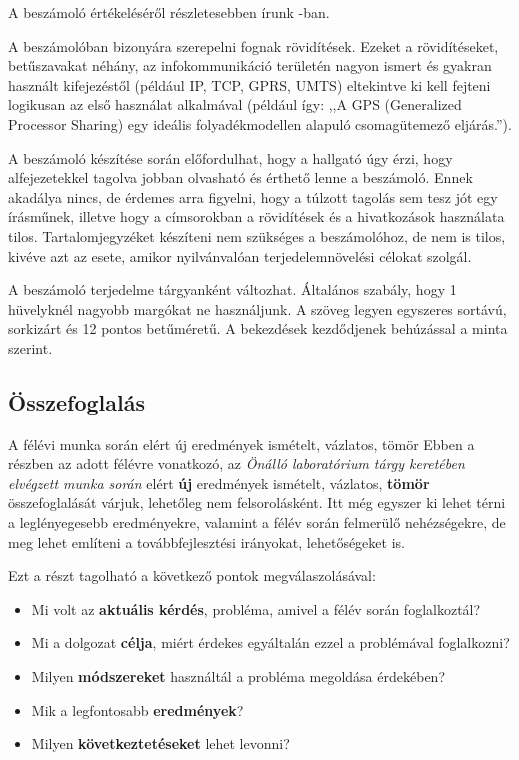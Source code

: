 \documentclass[a4paper,oneside]{article}
\begin{document}
A beszámoló értékeléséről részletesebben írunk \cite{web}-ban.

A beszámolóban bizonyára szerepelni fognak rövidítések. Ezeket a
rövidítéseket, betűszavakat néhány, az infokommunikáció területén
nagyon ismert és gyakran használt kifejezéstől (például IP, TCP, GPRS,
UMTS) eltekintve ki kell fejteni logikusan az első használat
alkalmával (például így: ,,A GPS (Generalized Processor Sharing) egy
ideális folyadékmodellen alapuló csomagütemező eljárás.'').

A beszámoló készítése során előfordulhat, hogy a hallgató úgy érzi,
hogy alfejezetekkel tagolva jobban olvasható és érthető lenne a
beszámoló.  Ennek akadálya nincs, de érdemes arra figyelni, hogy a
túlzott tagolás sem tesz jót egy írásműnek, illetve hogy a címsorokban
a rövidítések és a hivatkozások használata tilos.  Tartalomjegyzéket
készíteni nem szükséges a beszámolóhoz, de nem is tilos, kivéve azt az
esete, amikor nyilvánvalóan terjedelemnövelési célokat szolgál.

A beszámoló terjedelme tárgyanként változhat.  Általános szabály, hogy
1 hüvelyknél nagyobb margókat ne használjunk.  A szöveg legyen
egyszeres sortávú, sorkizárt és 12 pontos betűméretű.  A bekezdések
kezdődjenek behúzással a minta szerint.

\subsection{Összefoglalás}
\label{sec:osszefoglalas}

A félévi munka során elért új eredmények ismételt, vázlatos, tömör
Ebben a részben az adott félévre vonatkozó, az \emph{Önálló
  laboratórium tárgy keretében elvégzett munka során} elért
\textbf{új} eredmények ismételt, vázlatos, \textbf{tömör}
összefoglalását várjuk, lehetőleg nem felsorolásként.  Itt még egyszer
ki lehet térni a leglényegesebb eredményekre, valamint a félév során
felmerülő nehézségekre, de meg lehet említeni a továbbfejlesztési
irányokat, lehetőségeket is.

Ezt a részt tagolható a következő pontok megválaszolásával:
\begin{itemize}
  \item Mi volt az \textbf{aktuális kérdés}, probléma, amivel a félév
        során foglalkoztál?
  \item Mi a dolgozat \textbf{célja}, miért érdekes egyáltalán ezzel a
        problémával foglalkozni?
  \item Milyen \textbf{módszereket} használtál a probléma megoldása
        érdekében?
  \item Mik a legfontosabb \textbf{eredmények}?
  \item Milyen \textbf{következtetéseket} lehet levonni?

\end{itemize}
\end{document}

